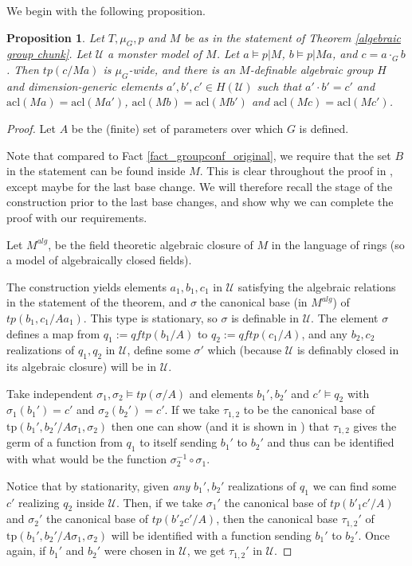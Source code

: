 \documentclass[12pt]{article}
\newtheorem{prop}[thm]{Proposition}
\theoremstyle{definition}
\theoremstyle{mystyle}
\theoremstyle{remark}
\newcommand{\acl}{\mathrm{acl}}
\newcommand{\tp}{\mathrm{tp}}
\begin{document}
We begin with the following proposition.

\begin{prop}\label{prop_groupconf}
Let $T, \mu_G,p$ and $M$ be as in the statement of Theorem
\ref{algebraic group chunk}. Let $\mathcal{U}$ a monster model of
$M$. Let $a\models p|M$, $b\models p|Ma$, and $c=a\cdot_G b$. Then
$tp(c/Ma)$ is $\mu_G$-wide, and there is an $M$-definable
algebraic group $H$ and dimension-generic elements $a', b', c'\in
H(\mathcal{U})$ such that $a'\cdot b' = c'$ and
$\acl(Ma)=\acl(Ma')$, $\acl(Mb)=\acl(Mb')$ and
$\acl(Mc)=\acl(Mc')$.
\end{prop}


\begin{proof}
Let $A$ be the (finite) set of parameters over which $G$ is
defined.

Note that compared to Fact \ref{fact_groupconf_original}, we require that the set $B$
in the statement can be found inside $M$. This is clear
throughout the proof in \cite{HrPi}, except maybe for the last
base change. We will therefore recall the stage of the
construction prior to the last base changes, and show why we can
complete the proof with our requirements.

Let $M^{alg}$, be the field theoretic algebraic closure of $M$ in
the language of rings (so a model of algebraically closed fields).

The construction yields elements  $a_1, b_1, c_1$ in $\mathcal U$
satisfying the algebraic relations in the statement of the
theorem, and $\sigma$ the canonical base (in $M^{alg}$) of
$tp(b_1, c_1/A a_1)$. This type is stationary, so $\sigma$ is
definable in $\mathcal U$. The element $\sigma$ defines a map from
$q_1:=qftp(b_1/A)$ to $q_2:=qftp(c_1/A)$, and any $b_2, c_2$
realizations of $q_1, q_2$ in $\mathcal U$, define some $\sigma'$
which (because $\mathcal U$ is definably closed in its algebraic
closure) will be in $\mathcal U$.


Take independent $\sigma_1, \sigma_2\models tp(\sigma/A)$ and
elements $b_1', b_2'$ and $c'\models q_2$ with $\sigma_1(b_1')=c'$
and $\sigma_2(b_2')=c'$. If we take $\tau_{1,2}$ to be the
canonical base of $\tp(b_1', b_2'/A\sigma_1, \sigma_2)$ then one
can show (and it is shown in \cite{HrPi}) that $\tau_{1,2}$ gives
the germ of a function from $q_1$ to itself sending $b_1'$ to
$b_2'$ and thus can be identified with what would be the function
$\sigma_2^{-1}\circ \sigma_1$.

Notice that by stationarity, given \emph{any} $b_1', b_2'$
realizations of $q_1$ we can find some $c'$ realizing $q_2$ inside
$\mathcal U$. Then, if we take $\sigma_1'$ the canonical base of
$tp(b'_1 c'/A)$ and $\sigma_2'$ the canonical base of $tp(b'_2
c'/A)$, then the canonical base $\tau_{1,2}'$ of $\tp(b_1',
b_2'/A\sigma_1, \sigma_2)$ will be identified with a function
sending $b_1'$ to $b_2'$. Once again, if $b_1'$ and $b_2'$ were
chosen in $\mathcal U$, we get $\tau_{1,2}'$ in $\mathcal U$.



\end{proof}
\end{document}
